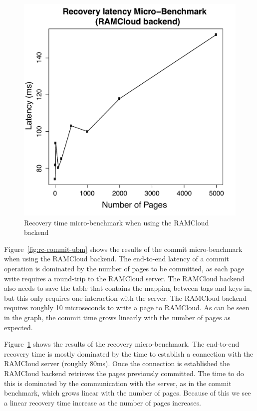 \begin{figure}[t!]
\begin{center}
\includegraphics[scale=0.40]{graphs/recovery_time_rc_latencies.pdf}
\end{center}
\caption{Recovery time micro-benchmark when using the RAMCloud backend}
\label{fig:rc-recovery-ubm}
\end{figure}

Figure~\ref{fig:rc-commit-ubm} shows the results of the commit micro-benchmark when using the RAMCloud backend. 
The end-to-end latency of a commit operation is dominated by the number of pages to be committed, as each page write requires a round-trip to the RAMCloud server.
The RAMCloud backend also needs to save the table that contains the mapping between tags and keys in, but this only requires one interaction with the server.
The RAMCloud backend requires roughly 10 microseconds to write a page to RAMCloud. As can be seen in the graph, the commit time grows linearly with the number of pages as expected.

Figure~\ref{fig:rc-recovery-ubm} shows the results of the recovery micro-benchmark.
The end-to-end recovery time is mostly dominated by the time to establish a connection with the RAMCloud server (roughly 80ms).
Once the connection is established the RAMCloud backend retrieves the pages previously committed. The time to do this is dominated by the communication with the server, as in the commit benchmark, which grows linear with the number of pages.
Because of this we see a linear recovery time increase as the number of pages increases.

